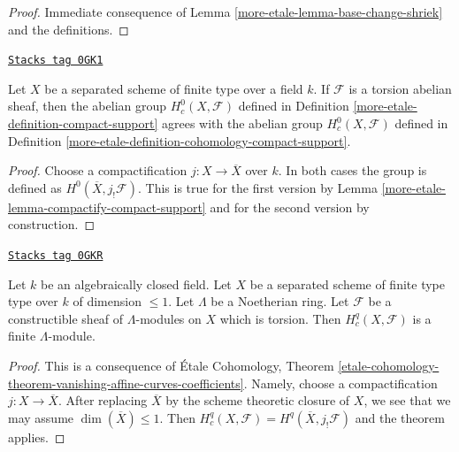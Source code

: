 \begin{proof}
Immediate consequence of Lemma \ref{more-etale-lemma-base-change-shriek} and the
definitions.
\end{proof}

\begin{lemma}
\label{more-etale-lemma-compact-support-h0}
\href{https://stacks.math.columbia.edu/tag/0GK1}{\texttt{Stacks tag 0GK1}}

Let $X$ be a separated scheme of finite type over a field $k$.
If $\mathcal{F}$ is a torsion abelian sheaf, then the abelian group
$H^0_c(X, \mathcal{F})$ defined in Definition \ref{more-etale-definition-compact-support}
agrees with the abelian group $H^0_c(X, \mathcal{F})$ defined in
Definition \ref{more-etale-definition-cohomology-compact-support}.
\end{lemma}

\begin{proof}
Choose a compactification $j : X \to \overline{X}$ over $k$.
In both cases the group is defined as $H^0(\overline{X}, j_!\mathcal{F})$.
This is true for the first version by
Lemma \ref{more-etale-lemma-compactify-compact-support}
and for the second version by construction.
\end{proof}

\begin{lemma}
\label{more-etale-lemma-finiteness-curves}
\href{https://stacks.math.columbia.edu/tag/0GKR}{\texttt{Stacks tag 0GKR}}

Let $k$ be an algebraically closed field. Let $X$ be a separated
scheme of finite type type over $k$ of dimension $\leq 1$.
Let $\Lambda$ be a Noetherian ring.
Let $\mathcal{F}$ be a constructible sheaf of $\Lambda$-modules
on $X$ which is torsion. Then $H^q_c(X, \mathcal{F})$ is a
finite $\Lambda$-module.
\end{lemma}

\begin{proof}
This is a consequence of \'Etale Cohomology, Theorem
\ref{etale-cohomology-theorem-vanishing-affine-curves-coefficients}.
Namely, choose a compactification $j : X \to \overline{X}$.
After replacing $\overline{X}$ by the scheme theoretic closure
of $X$, we see that we may assume $\dim(\overline{X}) \leq 1$.
Then $H^q_c(X, \mathcal{F}) = H^q(\overline{X}, j_!\mathcal{F})$
and the theorem applies.
\end{proof}

